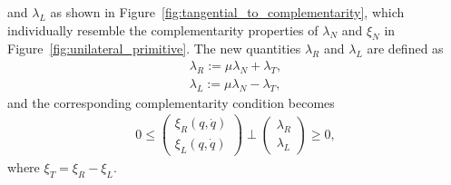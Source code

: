 and $\lambda_L$ as shown in Figure~\ref{fig:tangential_to_complementarity},
which individually resemble the complementarity properties of $\lambda_N$ and
$\xi_N$ in Figure~\ref{fig:unilateral_primitive}.
%
The new quantities $\lambda_R$ and $\lambda_L$ are defined as~\cite{glocker2005formulation}
\begin{align*}
  \lambda_R := \mu \lambda_N + \lambda_T, \\
  \lambda_L := \mu \lambda_N - \lambda_T, 
\end{align*}
\noindent and the corresponding complementarity condition becomes
%
\begin{equation}
  \begin{gathered}
    0 \leq 
    \begin{pmatrix}
      \xi_R(q, \dot{q}) \\
      \xi_L(q, \dot{q})
    \end{pmatrix} 
    \perp
      \begin{pmatrix}
        \lambda_R  \\
        \lambda_L
      \end{pmatrix} \geq 0,
    \end{gathered}
    \label{eq:tangential_complementarity}
\end{equation}
where $\xi_T = \xi_R - \xi_L$.
%


